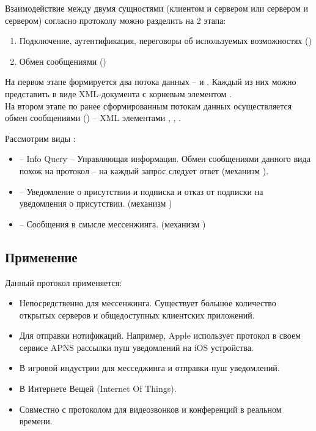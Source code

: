 Взаимодействие между двумя сущностями (клиентом и сервером или сервером и сервером) согласно протоколу можно разделить на 2 этапа:

\begin{enumerate}
	\item Подключение, аутентификация, переговоры об используемых возможностях ()
	\item Обмен сообщениями ()
\end{enumerate}

На первом этапе формируется два потока данных --  и . Каждый из них можно представить в виде XML-документа с корневым элементом .\\

На втором этапе по ранее сформированным потокам данных осуществляется обмен сообщениями () -- XML элементами , , .

Рассмотрим виды :

\begin{itemize}
	\item {} -- Info Query -- Управляющая информация. Обмен сообщениями данного вида похож на протокол  -- на каждый запрос следует ответ (механизм ).
	\item {} -- Уведомление о присутствии и подписка и отказ от подписки на уведомления о присутствии. (механизм )
	\item {} -- Сообщения в смысле мессенжинга. (механизм )
\end{itemize}

\subsection{Применение}

Данный протокол применяется:

\begin{itemize}
	\item Непосредственно для мессенжинга. Существует большое количество открытых серверов и общедоступных клиентских приложений.
	\item Для отправки  нотификаций. Например, Apple использует протокол в своем сервисе APNS рассылки пуш уведомлений на iOS устройства.
	\item В игровой индустрии для месседжинга и отправки пуш уведомлений.
	\item В Интернете Вещей (Internet Of Things).
	\item Совместно с протоколом  для видеозвонков и конференций в реальном времени.
\end{itemize}

